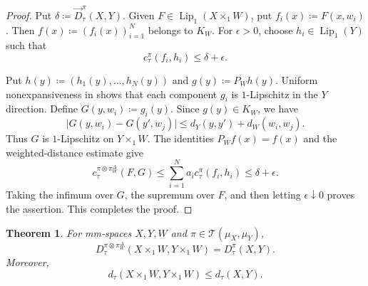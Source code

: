 \documentclass[11pt]{amsart}
\theoremstyle{plain}
\newtheorem{theorem}{Theorem}[section]
\theoremstyle{definition}
\theoremstyle{remark}
\newcommand{\T}{\mathcal T}
\newcommand{\dtau}{d_{\tau}}
\begin{document}
\begin{proof}
Put $\delta\coloneqq\overrightarrow D_\tau^\pi(X,Y)$. Given $F\in\operatorname{Lip}_1(X\times_1W)$, put $f_i(x)\coloneqq F(x,w_i)$. Then $f(x)\coloneqq(f_i(x))_{i=1}^N$ belongs to $K_W$. For $\epsilon>0$, choose $h_i\in\operatorname{Lip}_1(Y)$ such that
\[
c_\tau^\pi(f_i,h_i)\leq\delta+\epsilon.
\]

Put $h(y)\coloneqq(h_1(y),\ldots,h_N(y))$ and $g(y)\coloneqq P_Wh(y)$. Uniform nonexpansiveness in  shows that each component $g_i$ is $1$-Lipschitz in the $Y$ direction. Define $G(y,w_i)\coloneqq g_i(y)$. Since $g(y)\in K_W$, we have
\[
\lvert G(y,w_i)-G(y',w_j)\rvert
\leq d_Y(y,y')+d_W(w_i,w_j).
\]
Thus $G$ is $1$-Lipschitz on $Y\times_1W$. The identities $P_Wf(x)=f(x)$ and the weighted-distance estimate give
\[
c_\tau^{\pi\otimes\pi_W^\Delta}(F,G)\leq\sum_{i=1}^Na_i c_\tau^\pi(f_i,h_i)\leq\delta+\epsilon.
\]
Taking the infimum over $G$, the supremum over $F$, and then letting $\epsilon\downarrow0$ proves the assertion. This completes the proof.
\end{proof}

\begin{theorem}
\label{thm:tau-tensorization}
For mm-spaces $X,Y,W$ and $\pi\in\T(\mu_X,\mu_Y)$,
\[
D_\tau^{\pi\otimes\pi_W^\Delta}(X\times_1W,Y\times_1W)=D_\tau^\pi(X,Y).
\]
Moreover,
\[
\dtau(X\times_1W,Y\times_1W)\leq\dtau(X,Y).
\]
\end{theorem}
\end{document}
